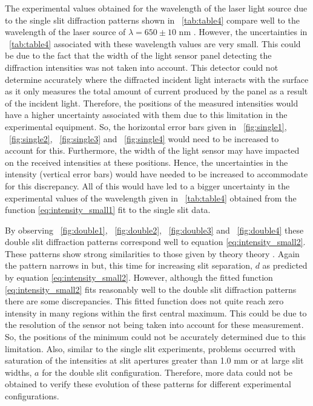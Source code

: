 \documentclass{article}
\newcommand{\figref}[2][\figurename~]{#1\ref{#2}}
\newcommand{\tabref}[2][\tablename~]{#1\ref{#2}}
\begin{document}
\vspace{2mm}
\noindent
The experimental values obtained for the wavelength of the laser light source due to the single slit diffraction patterns shown in \tabref{tab:table4} compare well to the wavelength of the laser source of $\lambda = 650 \pm 10$ nm \cite{Web02}. However, the uncertainties in \tabref{tab:table4} associated with these wavelength values are very small. This could be due to the fact that the width of the light sensor panel detecting the diffraction intensities was not taken into account. This detector could not determine accurately where the diffracted incident light interacts with the surface as it only measures the total amount of current produced by the panel as a result of the incident light. Therefore, the positions of the measured intensities would have a higher uncertainty associated with them due to this limitation in the experimental equipment. So, the horizontal error bars given in \figref{fig:single1}, \figref{fig:single2}, \figref{fig:single3} and \figref{fig:single4} would need to be increased to account for this. Furthermore, the width of the light sensor may have impacted on the received intensities at these positions. Hence, the uncertainties in the intensity (vertical error bars) would have needed to be increased to accommodate for this discrepancy. All of this would have led to a bigger uncertainty in the experimental values of the wavelength given in \tabref{tab:table4} obtained from the function \eqref{eq:intensity_small1} fit to the single slit data. 

\vspace{2mm}
\noindent
By observing \figref{fig:double1}, \figref{fig:double2}, \figref{fig:double3} and \figref{fig:double4} these double slit diffraction patterns correspond well to equation  \eqref{eq:intensity_small2}. These patterns show strong similarities to those given by theory theory \cite{Book04}. Again the pattern narrows in but, this time for increasing slit separation, $d$ as predicted by equation \eqref{eq:intensity_small2}. However, although the fitted function \eqref{eq:intensity_small2} fits reasonably well to the double slit diffraction patterns there are some discrepancies. This fitted function does not quite reach zero intensity in many regions within the first central maximum. This could be due to the resolution of the sensor not being taken into account for these measurement. So, the positions of the minimum could not be accurately determined due to this limitation. Also, similar to the single slit experiments, problems occurred with saturation of the intensities at slit apertures greater than 1.0 mm or at large slit widths, $a$ for the double slit configuration. Therefore, more data could not be obtained to verify these evolution of these patterns for different experimental configurations.
\end{document}
